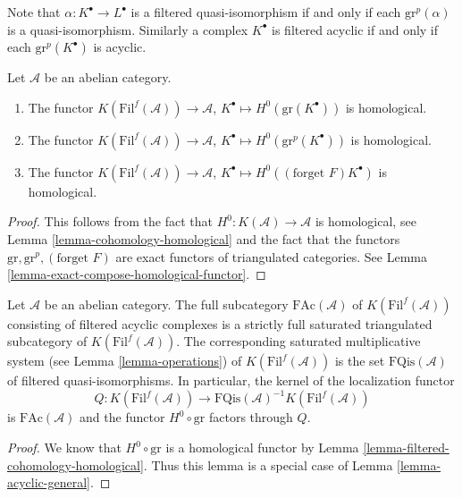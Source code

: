 \noindent
Note that $\alpha : K^\bullet \to L^\bullet$ is a filtered quasi-isomorphism
if and only if each $\text{gr}^p(\alpha)$ is a quasi-isomorphism. Similarly
a complex $K^\bullet$ is filtered acyclic if and only if each
$\text{gr}^p(K^\bullet)$ is acyclic.

\begin{lemma}
\label{lemma-filtered-cohomology-homological}
Let $\mathcal{A}$ be an abelian category.
\begin{enumerate}
\item The functor 
$K(\text{Fil}^f(\mathcal{A})) \longrightarrow \mathcal{A}$,
$K^\bullet \longmapsto H^0(\text{gr}(K^\bullet))$
is homological.
\item The functor
$K(\text{Fil}^f(\mathcal{A})) \rightarrow \mathcal{A}$,
$K^\bullet \longmapsto H^0(\text{gr}^p(K^\bullet))$
is homological.
\item The functor 
$K(\text{Fil}^f(\mathcal{A})) \longrightarrow \mathcal{A}$,
$K^\bullet \longmapsto H^0((\text{forget }F)K^\bullet)$
is homological.
\end{enumerate}
\end{lemma}

\begin{proof}
This follows from the fact that
$H^0 : K(\mathcal{A}) \to \mathcal{A}$ is homological, see
Lemma \ref{lemma-cohomology-homological}
and the fact that the functors $\text{gr}, \text{gr}^p, (\text{forget }F)$
are exact functors of triangulated categories. See
Lemma \ref{lemma-exact-compose-homological-functor}.
\end{proof}

\begin{lemma}
\label{lemma-filtered-acyclic}
Let $\mathcal{A}$ be an abelian category. The full subcategory
$\text{FAc}(\mathcal{A})$ of $K(\text{Fil}^f(\mathcal{A}))$
consisting of filtered acyclic complexes is a strictly full saturated
triangulated subcategory of $K(\text{Fil}^f(\mathcal{A}))$.
The corresponding saturated multiplicative system (see
Lemma \ref{lemma-operations})
of $K(\text{Fil}^f(\mathcal{A}))$ is the set
$\text{FQis}(\mathcal{A})$ of filtered quasi-isomorphisms.
In particular, the kernel of the localization
functor
$$
Q :
K(\text{Fil}^f(\mathcal{A}))
\longrightarrow
\text{FQis}(\mathcal{A})^{-1}K(\text{Fil}^f(\mathcal{A}))
$$
is $\text{FAc}(\mathcal{A})$ and the functor $H^0 \circ \text{gr}$
factors through $Q$.
\end{lemma}

\begin{proof}
We know that $H^0 \circ \text{gr}$ is a homological functor by
Lemma \ref{lemma-filtered-cohomology-homological}.
Thus this lemma is a special case of
Lemma \ref{lemma-acyclic-general}.
\end{proof}

